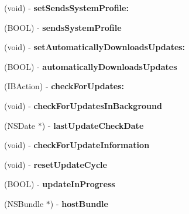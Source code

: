 \begin{DoxyCompactItemize}
(void) -\/ {\bfseries set\+Sends\+System\+Profile\+:}
\item 
\mbox{\label{interface_s_u_updater_a993b24444f00a8834600cf0ccdc6fca0}} 
(B\+O\+OL) -\/ {\bfseries sends\+System\+Profile}
\item 
\mbox{\label{interface_s_u_updater_afbe0599644f4d64e807728b3863116b7}} 
(void) -\/ {\bfseries set\+Automatically\+Downloads\+Updates\+:}
\item 
\mbox{\label{interface_s_u_updater_a40b5d37d68f0607ae602c75aa171ead9}} 
(B\+O\+OL) -\/ {\bfseries automatically\+Downloads\+Updates}
\item 
\mbox{\label{interface_s_u_updater_a283c6354fb1c1f7a853f0b2871d79802}} 
(I\+B\+Action) -\/ {\bfseries check\+For\+Updates\+:}
\item 
\mbox{\label{interface_s_u_updater_abdb91f3abfe5f06bcef7d92d21e60962}} 
(void) -\/ {\bfseries check\+For\+Updates\+In\+Background}
\item 
\mbox{\label{interface_s_u_updater_a340afae2e8f5e31bc614ebbd39b16796}} 
(N\+S\+Date $\ast$) -\/ {\bfseries last\+Update\+Check\+Date}
\item 
\mbox{\label{interface_s_u_updater_a30b1f73644272e79aa653ddfc6cf7c92}} 
(void) -\/ {\bfseries check\+For\+Update\+Information}
\item 
\mbox{\label{interface_s_u_updater_acf7fce45848ddc896467b9ba3af3578b}} 
(void) -\/ {\bfseries reset\+Update\+Cycle}
\item 
\mbox{\label{interface_s_u_updater_ac9b96e237f0aae2f2b5fe773eea32925}} 
(B\+O\+OL) -\/ {\bfseries update\+In\+Progress}
\item 
\mbox{\label{interface_s_u_updater_a3faf834b08c495d58e81f232baec1402}} 
(N\+S\+Bundle $\ast$) -\/ {\bfseries host\+Bundle}
\item 
\mbox{\label{interface_s_u_updater_ae5ea4c7e9f17e85dc3dfc6f07abceb4e}} 

\end{DoxyCompactItemize}
